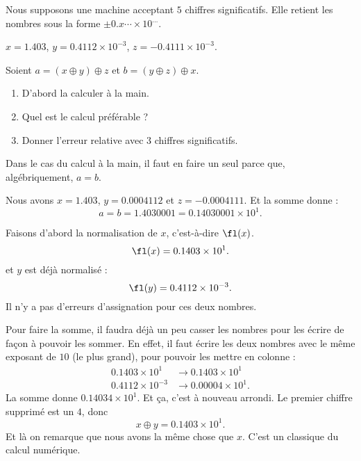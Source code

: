 \begin{example}

	Nous supposons une machine acceptant \( 5\) chiffres significatifs. Elle retient les nombres sous la forme \( \pm 0.x\cdots\times 10^{\ldots}\).

	\( x=1.403\), \( y=0.4112\times 10^{-3}\), \( z=-0.4111\times 10^{-3}\).

	Soient
	\( a=(x\oplus y)\oplus z\) et  \( b=(y\oplus z)\oplus x\).

	\begin{enumerate}
		\item
		      D'abord la calculer à la main.
		\item
		      Quel est le calcul préférable ?
		\item
		      Donner l'erreur relative avec \( 3\) chiffres significatifs.
	\end{enumerate}

	Dans le cas du calcul à la main, il faut en faire un seul parce que, algébriquement, \( a=b\).

	Nous avons \( x=1.403\), \( y=0.0004112\) et \( z=-0.0004111\). Et la somme donne :
	\begin{equation}
		a=b=1.4030001=0.14030001\times 10^1.
	\end{equation}

	Faisons d'abord la normalisation de \( x\), c'est-à-dire \( \fl(x)\).
	\begin{equation}
		\fl(x)=0.1403\times 10^1.
	\end{equation}
	et \( y\) est déjà normalisé :
	\begin{equation}
		\fl(y)=0.4112\times 10^{-3}.
	\end{equation}
	Il n'y a pas d'erreurs d'assignation pour ces deux nombres.

	Pour faire la somme, il faudra déjà un peu casser les nombres pour les écrire de façon à pouvoir les sommer. En effet, il faut écrire les deux nombres avec le même exposant de \( 10\) (le plus grand), pour pouvoir les mettre en colonne :
	\begin{subequations}
		\begin{align}
			0.1403\times 10^1    & \to 0.1403\times 10^1   \\
			0.4112\times 10^{-3} & \to 0.00004\times 10^1.
		\end{align}
	\end{subequations}
	La somme donne \( 0.14034\times 10 ^1\). Et ça, c'est à nouveau arrondi. Le premier chiffre supprimé est un \( 4\), donc
	\begin{equation}
		x\oplus y=0.1403\times 10^1.
	\end{equation}
	Et là on remarque que nous avons la même chose que \( x\). C'est un classique du calcul numérique.


\end{example}
